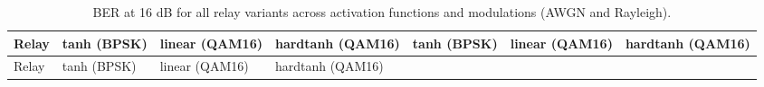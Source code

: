 \begin{longtable}[]{@{}
  >{\raggedright\arraybackslash}p{}
  >{\raggedright\arraybackslash}p{}
  >{\raggedright\arraybackslash}p{}
  >{\raggedright\arraybackslash}p{}
  >{\raggedright\arraybackslash}p{}
  >{\raggedright\arraybackslash}p{}
  >{\raggedright\arraybackslash}p{}@{}}
\caption{BER at 16 dB for all relay variants across activation functions and modulations (AWGN and Rayleigh).}\label{tbl:table15}\tabularnewline
\toprule\noalign{}
\begin{minipage}[b]{\linewidth}\raggedright
Relay
\end{minipage} & \begin{minipage}[b]{\linewidth}\raggedright
tanh (BPSK)
\end{minipage} & \begin{minipage}[b]{\linewidth}\raggedright
linear (QAM16)
\end{minipage} & \begin{minipage}[b]{\linewidth}\raggedright
hardtanh (QAM16)
\end{minipage} & \begin{minipage}[b]{\linewidth}\raggedright
tanh (BPSK)
\end{minipage} & \begin{minipage}[b]{\linewidth}\raggedright
linear (QAM16)
\end{minipage} & \begin{minipage}[b]{\linewidth}\raggedright
hardtanh (QAM16)
\end{minipage} \\
\midrule\noalign{}
\endfirsthead
\toprule\noalign{}
\begin{minipage}[b]{\linewidth}\raggedright
Relay
\end{minipage} & \begin{minipage}[b]{\linewidth}\raggedright
tanh (BPSK)
\end{minipage} & \begin{minipage}[b]{\linewidth}\raggedright
linear (QAM16)
\end{minipage} & \begin{minipage}[b]{\linewidth}\raggedright
hardtanh (QAM16)
\end{minipage} & \begin{minipage}[b]{\linewidth}\raggedright

\end{minipage}
\end{longtable}
